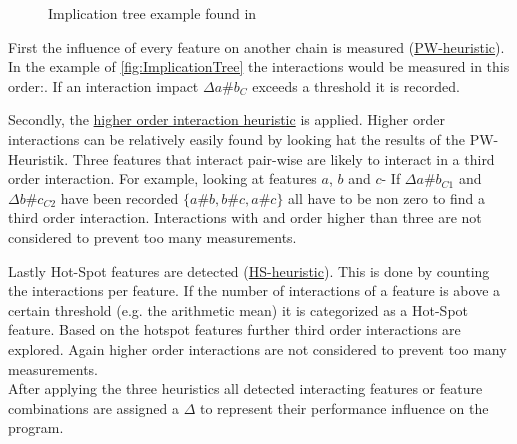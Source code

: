 \begin{wrapfigure}{l}{0.5\textwidth}

\captionsetup{width=0.95\linewidth}
\caption{Implication tree example found in \cite{AutomatedFeatureDetectionSiegmund2012} }
\label{fig:ImplicationTree}
\end{wrapfigure}

First the influence of every feature on another chain is measured (\hyperref[lab:PW]{PW-heuristic}). In the example of \autoref{fig:ImplicationTree} the interactions would be measured in this order:\cite{AutomatedFeatureDetectionSiegmund2012}. If an interaction impact $\Delta a\#b_C$ exceeds a threshold it is recorded.

Secondly, the \hyperref[lab:HO]{higher order interaction heuristic} is applied. Higher order interactions can be relatively easily found by looking hat the results of the PW-Heuristik. Three features that interact pair-wise are likely to interact in a third order interaction. For example, looking at features $a$, $b$ and $c$- If $\Delta a\#b_{C1}$ and $\Delta b\#c_{C2}$ have been recorded $\{a\#b, b\#c, a\#c\}$ all have to be non zero to find a third order interaction. Interactions with and order higher than three are not considered to prevent too many measurements.

Lastly Hot-Spot features are detected (\hyperref[lab:HS]{HS-heuristic}). This is done by counting the interactions per feature. If the number of interactions of a feature is above a certain threshold (e.g. the arithmetic mean) it is categorized as a Hot-Spot feature. Based on the hotspot features further third order interactions are explored. Again higher order interactions are not considered to prevent too many measurements. \\
After applying the three heuristics all detected interacting features or feature combinations are assigned a $\Delta$ to represent their performance influence on the program.

